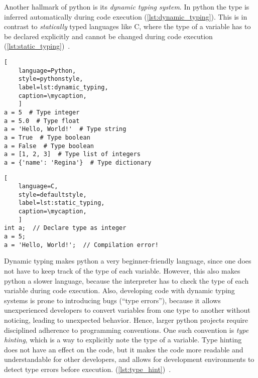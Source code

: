 Another hallmark of python is its \textit{dynamic typing system}. In python the type  is
inferred automatically during code execution (\autoref{lst:dynamic_typing}).
This is in contrast to \textit{statically} typed languages like C, where the type of a
variable has to be declared explicitly and cannot be changed during code
execution (\autoref{lst:static_typing})~\cite{PythonLanguageReference}.
\def\mycaption{ Example of dynamic typing in python. The variable ``\texttt{a}''
    is assigned the value 5, which is an integer. The variable ``\texttt{a}'' is
    then assigned the value ``\texttt{Hello, World!}'', which is a string.
    Python allows  Note that code after ``\texttt{\#}'' is considered a comment
    and won't be executed.}
\begin{lstlisting}[
    language=Python,
    style=pythonstyle,
    label=lst:dynamic_typing,
    caption=\mycaption,
    ]
a = 5  # Type integer
a = 5.0  # Type float
a = 'Hello, World!'  # Type string
a = True  # Type boolean
a = False  # Type boolean
a = [1, 2, 3]  # Type list of integers
a = {'name': 'Regina'}  # Type dictionary
\end{lstlisting}

\def\mycaption{ Example of static typing in C. The variable ``\texttt{a}'' is declared as
    an integer, and can only store integers. The variable ``\texttt{a}'' is then assigned
    the value 5, which is an integer. The variable ``\texttt{a}'' is then assigned the
    value \texttt{'Hello, World!'}, which is a string. This results in a compilation
    error, because the variable ``\texttt{a}'' can only store integers.}
\begin{lstlisting}[
    language=C,
    style=defaultstyle,
    label=lst:static_typing,
    caption=\mycaption,
    ]
int a;  // Declare type as integer
a = 5;
a = 'Hello, World!';  // Compilation error!
\end{lstlisting}
Dynamic typing makes python a very beginner-friendly language, since one does
not have to keep track of the type of each variable. However, this also makes
python a slower language, because the interpreter has to check the type of each
variable during code execution. Also, developing code with dynamic typing
systems is prone to introducing bugs (``type errors''), because it allows
unexperienced developers to convert variables from one type to another without
noticing, leading to unexpected behavior. Hence, larger python projects require
disciplined adherence to programming conventions. One such convention is
\textit{type hinting}, which is a way to explicitly note the type of a
variable. Type hinting does not have an effect on the code, but it makes the
code more readable and understandable for other developers, and allows for
development environments to detect type errors before execution.
(\autoref{lst:type_hint})~\cite{vanrossumPEP484Type2014}.

